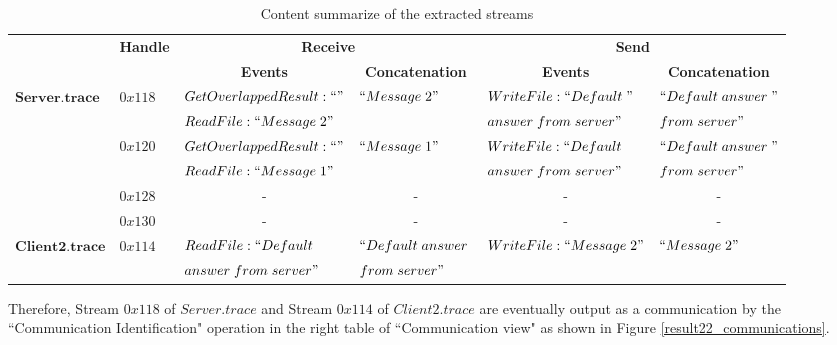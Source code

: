 \documentclass[12pt,oneside]{book}
\begin{document}
\begin{table}[H]
  \tiny
  \centering
  \caption{Content summarize of the extracted streams}
  \label{contentresult22}
  \begin{tabular}{|l|l|l|l|l|l|}
\hline            
& \multirow{2}{*}{\textbf{Handle}} & \multicolumn{2}{c|}{\textbf{Receive} }&\multicolumn{2}{c|}{\textbf{Send}} \\
\cline{3-6}
& &\multicolumn{1}{c|}{ \textbf{Events} }&\multicolumn{1}{c|}{\textbf{ Concatenation}}&\multicolumn{1}{c|}{ \textbf{Events} }&\multicolumn{1}{c|}{\textbf{ Concatenation}}\\
\hline 
\multirow{6}{*}{$\boldsymbol{Server.trace}$} &\multirow{2}{*}{$0x118$} & $GetOverlappedResult:``"$ & \multirow{2}{*}{$``Message\; 2"$} & $WriteFile:``Default\; "$ &  $``Default\; answer\; "$\\
\cline{3-3}
& &$ReadFile:``Message\; 2"$ &  & $answer\; from\; server"$&$from\; server"$\\
\cline{2-6}    
      &\multirow{2}{*}{$0x120$} & $GetOverlappedResult:``"$ & \multirow{2}{*}{$``Message\; 1"$} & $WriteFile:``Default\; $ &  $``Default\; answer\; "$\\
\cline{3-3}
& &$ReadFile:``Message\; 1"$ & &$answer\; from\; server"$ &$from\; server"$\\  
\cline{2-6}   
& $0x128$&\multicolumn{1}{c|}{- }&\multicolumn{1}{c|}{- } &\multicolumn{1}{c|}{- } &\multicolumn{1}{c|}{- }\\  
\cline{2-6}   
& $0x130$&\multicolumn{1}{c|}{- } &\multicolumn{1}{c|}{- } &\multicolumn{1}{c|}{- } &\multicolumn{1}{c|}{- }\\      
\hline  
\multirow{2}{*}{$\boldsymbol{Client2.trace}$ }&\multirow{2}{*}{$0x114$ }& $ReadFile: ``Default\; $ & $``Default\; answer\; $ & \multirow{2}{*}{$WriteFile:``Message\; 2"$ } &  \multirow{2}{*}{$``Message\; 2"$}\\
& &$answer\; from\; server"$& $ from\; server"$ & &\\
\hline
  \end{tabular}
\end{table}



Therefore, Stream $0x118$ of $Server.trace$ and Stream $0x114$ of $Client2.trace$ are eventually output as a communication by the ``Communication Identification" operation in the right table of ``Communication view" as shown in Figure \ref{result22_communications}. 
\end{document}
